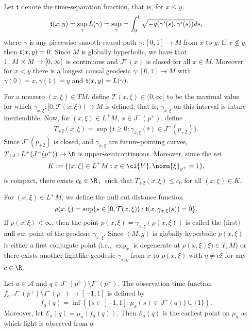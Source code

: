 Let $\frak{t}$ denote the time-separation function, that is, for $x\leq y$,
$$\frak{t}(x,y)=\sup_{\gamma}L(\gamma)=\sup_{\gamma}=\int_0^1\sqrt{-g(\gamma'(s),\gamma'(s))}ds,$$
where $\gamma$ is any piecewise smooth causal path $\gamma:[0,1]\to M$ from $x$ to $y$.  If $x\not\leq y$, then $\frak{t}(x,y)=0$.  Since $M$ is globally hyperbolic, we have that $\frak{t}:M\times M\to[0,\infty)$ is continuous and $J^\pm(x)$ is closed for all $x\in M$.  Moreover for $x<y$ there is a longest causal geodesic $\gamma:[0,1]\to M$ with $\gamma(0)=x, \gamma(1)=y$ and $\frak{t}(x,y)=L(\gamma).$

For a nonzero $(x,\xi)\in TM$, define $\mathcal{T}(x,\xi)\in(0,\infty]$ to be the maximal value for which $\gamma_{x,\xi}:[0,\mathcal{T}(x,\xi))\to M$ is defined, that is, $\gamma_{x,\xi}$ on this interval is future-inextendible. Now, for $(x,\xi)\in L^+M$, $x\in J^-(p^+)$, define
$$T_{+2}(x,\xi)=\sup\{t\geq0:\gamma_{x,\xi}(t)\in J^-(p_{+2})\}.$$
Since $J^-(p_{+2})$ is closed, and $\gamma_{x,\xi}$ are future-pointing curves, $T_{+2}:L^+(J^-(p^+))\to\R$ is upper-semicontinuous.  Moreover, since the set
$$K:=\{(x,\xi)\in L^+M:x\in\cl{V}, \norm{\xi}_{g^+}=1\},$$
is compact, there exists $c_0\in\R_+$ such that $T_{+2}(x,\xi)\leq c_0$ for all $(x,\xi)\in K$.

For $(x,\xi)\in L^+M$, we define the null cut distance function
$$\rho(x,\xi)=\sup\{s\in[0,\mathcal{T}(x,\xi)):\frak{t}(x,\gamma_{x,\xi}(s))=0\}.$$
If $\rho(x,\xi)<\infty$, then the point $p(x,\xi)=\gamma_{x,\xi}(\rho(x,\xi))$ is called the (first) null cut point of the geodesic $\gamma_{x,\xi}$.  Since $(M,g)$ is globally hyperbolic $p(x,\xi)$ is either a first conjugate point (i.e., $\exp_x$ is degenerate at $\rho(x,\xi)\xi)\in T_xM$) or there exists another lightlike geodesic $\gamma_{x,\eta}$ from $x$ to $p(x,\xi)$ with $\eta\neq c\xi$ for any $c\in\R$.


\begin{defn}
    Let $a\in\mathcal{A}$ and $q\in J^-(p^+)\setminus I^-(p^-)$.  The observation time function $f_a:J^-(p^+)\setminus I^-(p^-)\to[-1,1]$ is defined by
    $$f_a(q)=\inf\left(\{s\in[-1,1]:\mu_a(s)\in J^+(q)\}\cup\{1\}\right).$$
    Moreover, let $\mathcal{E}_a(q)=\mu_a(f_a(q)).$  Then $\mathcal{E}_a(q)$ is the earliest point on $\mu_a$ as which light is observed from $q$.
\end{defn}



